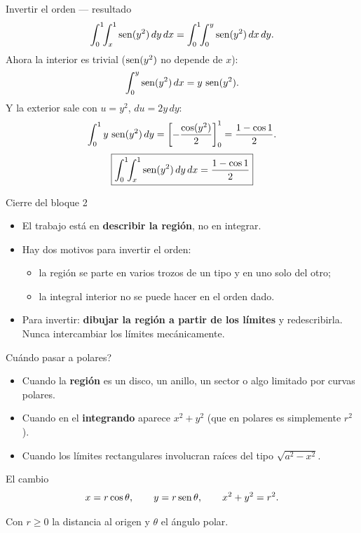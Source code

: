 \documentclass[11pt,aspectratio=169]{beamer}
\begin{document}
\begin{frame}{Invertir el orden --- resultado}
  \[
    \int_0^1\!\!\int_x^1 \operatorname{sen}(y^2)\,dy\,dx
    = \int_0^1\!\!\int_0^y \operatorname{sen}(y^2)\,dx\,dy.
  \]
  \pause
  Ahora la interior es trivial ($\operatorname{sen}(y^2)$ no depende de $x$):
  \[
    \int_0^y \operatorname{sen}(y^2)\,dx = y\,\operatorname{sen}(y^2).
  \]
  \pause
  Y la exterior sale con $u=y^2$, $du=2y\,dy$:
  \[
    \int_0^1 y\,\operatorname{sen}(y^2)\,dy = \left[-\frac{\cos(y^2)}{2}\right]_0^1 = \frac{1-\cos 1}{2}.
  \]
  \pause
  \[
    \boxed{\int_0^1\!\!\int_x^1 \operatorname{sen}(y^2)\,dy\,dx = \frac{1-\cos 1}{2}}
  \]
\end{frame}

\begin{frame}{Cierre del bloque 2}
  \begin{itemize}
    \item El trabajo está en \textbf{describir la región}, no en integrar.
    \pause
    \item Hay dos motivos para invertir el orden:
    \begin{itemize}
      \item la región se parte en varios trozos de un tipo y en uno solo del otro;
      \item la integral interior no se puede hacer en el orden dado.
    \end{itemize}
    \pause
    \item Para invertir: \textbf{dibujar la región a partir de los límites} y redescribirla. Nunca intercambiar los límites mecánicamente.
  \end{itemize}
  \vspace{8pt}
  \pause
\end{frame}


\begin{frame}{\textquestiondown{}Cuándo pasar a polares?}
  \begin{itemize}
    \item Cuando la \textbf{región} es un disco, un anillo, un sector o algo limitado por curvas polares.
    \pause
    \item Cuando en el \textbf{integrando} aparece $x^2+y^2$ (que en polares es simplemente $r^2$).
    \pause
    \item Cuando los límites rectangulares involucran raíces del tipo $\sqrt{a^2-x^2}$.
  \end{itemize}
  \vspace{10pt}
  \pause
  \begin{block}{El cambio}
    \[
      x=r\cos\theta,\qquad y=r\operatorname{sen}\theta,\qquad x^2+y^2=r^2.
    \]
  \end{block}
  \pause
  \begin{center}\small\color{gray60} Con $r\ge0$ la distancia al origen y $\theta$ el ángulo polar.\end{center}
\end{frame}
\end{document}
